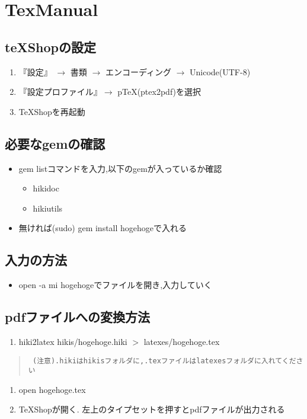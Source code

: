 \documentclass[10pt,a4j,twocolumn]{jsarticle}
\begin{document}
\section{TexManual}
\subsection{teXShopの設定}\begin{enumerate}
\item 『設定』 $\rightarrow$ ︎書類 $\rightarrow$ ︎エンコーディング $\rightarrow$ Unicode(UTF-8)
\item 『設定プロファイル』$\rightarrow$ pTeX(ptex2pdf)を選択
\item TeXShopを再起動
\end{enumerate}
\subsection{必要なgemの確認}\begin{itemize}
\item gem listコマンドを入力,以下のgemが入っているか確認\begin{itemize}
\item hikidoc
\item hikiutils
\end{itemize}
\item ︎︎無ければ(sudo) gem install hogehogeで入れる
\end{itemize}
\subsection{入力の方法}\begin{itemize}
\item open -a mi hogehogeでファイルを開き,入力していく
\end{itemize}
\subsection{pdfファイルへの変換方法}\begin{enumerate}
\item hiki2latex hikis/hogehoge.hiki $>$ latexes/hogehoge.tex
\end{enumerate}\begin{quote}\begin{verbatim}
 (注意).hikiはhikisフォルダに,.texファイルはlatexesフォルダに入れてください
\end{verbatim}\end{quote}\begin{enumerate}
\item open hogehoge.tex
\item TeXShopが開く. 左上のタイプセットを押すとpdfファイルが出力される
\end{enumerate}
\end{document}
